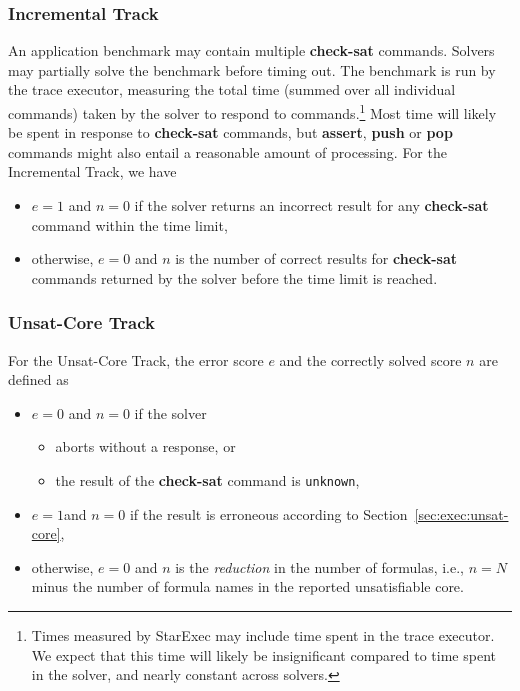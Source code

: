 \documentclass[12pt]{article}
\newcommand{\akey}[1]{\textbf{#1}\xspace}
\newcommand{\inctrack}{Incremental Track\xspace}
\newcommand{\ucoretrack}{Unsat-Core Track\xspace}
\begin{document}
\subsubsection{Incremental Track}
%
An application benchmark may contain multiple \akey{check-sat}
commands.  Solvers may partially solve the benchmark before timing
out.  The benchmark is run by the trace executor, measuring the total
time (summed over all individual commands) taken by the solver to
respond to commands.\footnote{Times measured by StarExec may include
  time spent in the trace executor.  We expect that this time will
  likely be insignificant compared to time spent in the solver, and
  nearly constant across solvers.}  Most time will likely be spent in
response to \akey{check-sat} commands, but \akey{assert}, \akey{push}
or \akey{pop} commands might also entail a reasonable amount of
processing.  For the \inctrack, we have
\begin{itemize}
\item $e=1$ and $n=0$ if the solver returns an incorrect result for any
  \akey{check-sat} command within the time limit,
\item otherwise, $e=0$ and $n$ is the number of correct results for
  \akey{check-sat} commands returned by the solver before the time
  limit is reached.
\end{itemize}

\subsubsection{\ucoretrack}
  For the \ucoretrack, the error score $e$ and the correctly solved score $n$
  are defined as
  \begin{itemize}
  \item $e=0$ and $n=0$ if the solver
    \begin{itemize}[noitemsep,nolistsep]
      \item aborts without a response, or
      \item the result of the \akey{check-sat} command is \texttt{unknown},
    \end{itemize}
  \item $e=1$and  $n=0$ if the result is erroneous according to
    Section~\ref{sec:exec:unsat-core},
  \item otherwise, $e=0$ and $n$ is the \emph{reduction} in the number of
    formulas, i.e., $n = N$ minus the number of formula names in the
    reported unsatisfiable core.
  \end{itemize}
\end{document}
